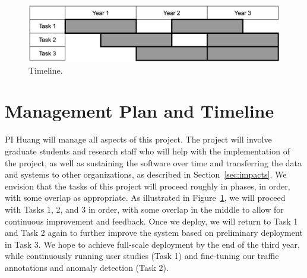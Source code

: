 \begin{figure}[t]
    \centering
    \includegraphics[width=0.6\linewidth]{figures/timeline.png}
    \caption{Timeline.}
    \label{fig:timeline}
\end{figure}


\section{Management Plan and Timeline}\label{sec:management}

PI Huang will manage all aspects of this project. The project will involve
graduate students and research staff who will help with the implementation of
the project, as well as sustaining the software over time and transferring the
data and systems to other organizations, as described in
Section~\ref{sec:impacts}. We envision that the tasks of this project will
proceed roughly in phases, in order, with some overlap as appropriate. As illustrated in Figure~\ref{fig:timeline}, we will proceed with Tasks 1, 2, and 3 in order, with some overlap in the middle to allow for continuous improvement and feedback. Once we deploy, we will return to Task 1 and Task 2 again to further improve the system based on preliminary deployment in Task 3. We hope to achieve full-scale deployment by the end of the third year, while continuously running user studies (Task 1) and fine-tuning our traffic annotations and anomaly detection (Task 2).
